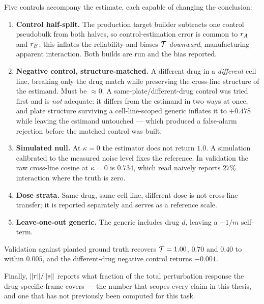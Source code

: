 Five controls accompany the estimate, each capable of changing the conclusion:
\begin{enumerate}
  \item \textbf{Control half-split.} The production target builder subtracts one control pseudobulk
        from both halves, so control-estimation error is common to $r_A$ and $r_B$; this
        inflates the reliability and biases $\mathcal{T}$ \emph{downward}, manufacturing apparent
        interaction. Both builds are run and the bias reported.
  \item \textbf{Negative control, structure-matched.} A different drug in a \emph{different} cell line, breaking only the drug match while preserving the cross-line structure of the estimand. Must be $\approx 0$. A same-plate/different-drug control was tried first and is \emph{not} adequate: it differs from the estimand in two ways at once, and plate structure surviving a cell-line-scoped generic inflates it to $+0.478$ while leaving the estimand untouched --- which produced a false-alarm rejection before the matched control was built.
  \item \textbf{Simulated null.} At $\kappa = 0$ the estimator does not return $1.0$. A simulation
        calibrated to the measured noise level fixes the reference. In validation the raw cross-line
        cosine at $\kappa = 0$ is $0.734$, which read naively reports $27\%$ interaction where the
        truth is zero.
  \item \textbf{Dose strata.} Same drug, same cell line, different dose is not cross-line transfer;
        it is reported separately and serves as a reference scale.
  \item \textbf{Leave-one-out generic.} The generic includes drug $d$, leaving a $-1/m$ self-term.
\end{enumerate}
Validation against planted ground truth recovers $\mathcal{T} = 1.00$, $0.70$ and $0.40$ to within
$0.005$, and the different-drug negative control returns $-0.001$.

Finally, $\lVert r \rVert / \lVert s \rVert$ reports what fraction of the total
perturbation response the drug-specific frame covers --- the number that scopes every claim in this
thesis, and one that has not previously been computed for this task.
